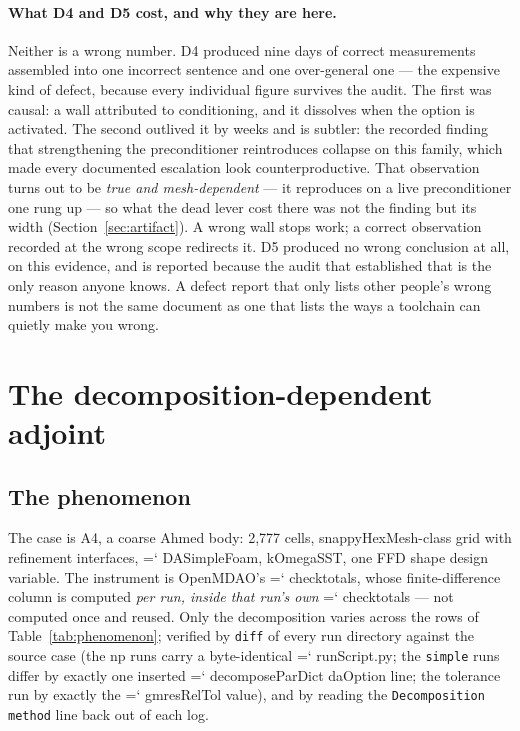 \documentclass[11pt,a4paper]{article}
\newcommand{\artifact}[1]{{\small\ttfamily\hyphenchar\font=`\-\relax
  \def\_{\textunderscore\allowbreak}#1}}
\begin{document}
\paragraph{What D4 and D5 cost, and why they are here.} Neither is a wrong number. D4 produced
nine days of correct measurements assembled into one incorrect sentence and one over-general
one --- the expensive kind of defect, because every individual figure survives the audit. The
first was causal: a wall attributed to conditioning, and it dissolves when the option is
activated. The second outlived it by weeks and is subtler: the recorded finding that
strengthening the preconditioner reintroduces collapse on this family, which made every
documented escalation look counterproductive. That observation turns out to be \emph{true and
mesh-dependent} --- it reproduces on a live preconditioner one rung up --- so what the dead
lever cost there was not the finding but its width (Section~\ref{sec:artifact}). A wrong wall
stops work; a correct observation recorded at the wrong scope redirects it. D5
produced no wrong conclusion at all, on this evidence, and is reported because the audit that
established that is the only reason anyone knows. A defect report that only lists other
people's wrong numbers is not the same document as one that lists the ways a toolchain can
quietly make you wrong.

\section{The decomposition-dependent adjoint}
\label{sec:decomp}

\subsection{The phenomenon}

The case is A4, a coarse Ahmed body: 2{,}777 cells, snappyHexMesh-class grid with
refinement interfaces, \artifact{DASimpleFoam}, kOmegaSST, one FFD shape design variable.
The instrument is OpenMDAO's \artifact{check\_totals}, whose finite-difference column is
computed \emph{per run, inside that run's own} \artifact{check\_totals} --- not computed
once and reused. Only the decomposition varies across the rows of
Table~\ref{tab:phenomenon}; verified by \texttt{diff} of every run directory against the
source case (the np runs carry a byte-identical \artifact{runScript.py}; the \texttt{simple}
runs differ by exactly one inserted \artifact{decomposeParDict} daOption line; the tolerance
run by exactly the \artifact{gmresRelTol} value), and by reading the
\texttt{Decomposition method} line back out of each log.
\end{document}
